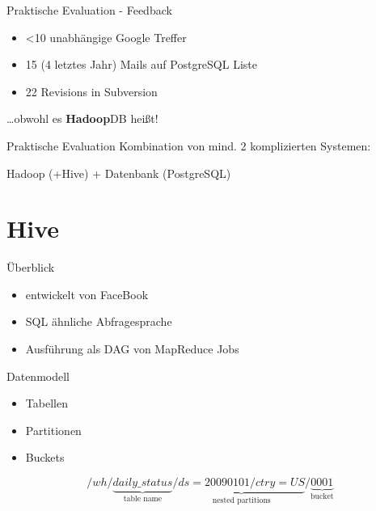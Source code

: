 \documentclass{beamer}
\begin{document}
\begin{frame}{Praktische Evaluation - Feedback}
  \begin{itemize}
  \item \textless 10 unabhängige Google Treffer
  \item 15 (4 letztes Jahr) Mails auf PostgreSQL Liste
  \item 22 Revisions in Subversion
  \end{itemize}
  \pause
  \ldots obwohl es \textbf{Hadoop}DB heißt!
\end{frame}

\begin{frame}{Praktische Evaluation}
  Kombination von mind. 2 komplizierten Systemen:

  Hadoop (+Hive) + Datenbank (PostgreSQL)
\end{frame}

\section{Hive}

\begin{frame}{Überblick}
  \begin{itemize}
    \item entwickelt von FaceBook
    \item SQL ähnliche Abfragesprache
    \item Ausführung als DAG von MapReduce Jobs
  \end{itemize}
\end{frame}

\begin{frame}{Datenmodell}  
  \begin{itemize}
  \item Tabellen
  \item Partitionen
  \item Buckets
  \end{itemize}
\begin{displaymath}
  /wh/\underbrace{daily\_status}_{\text{table name}}/\underbrace{ds=20090101/ctry=US}_{\text{nested partitions}}/\underbrace{0001}_{\text{bucket}}
\end{displaymath}
\end{frame}
\end{document}
